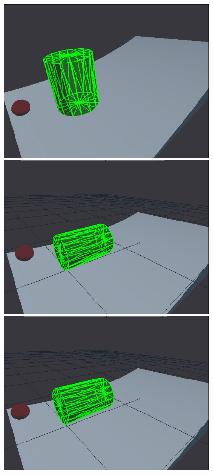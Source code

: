 \newlength{\imgwid}
\setlength{\imgwid}{2.5cm}

\begin{figure}[htbp]
\centerline{
\includegraphics[width=\imgwid]{./A00000}
\includegraphics[width=\imgwid]{./B00257}
\includegraphics[width=\imgwid]{./C00900}
}
\end{figure}
